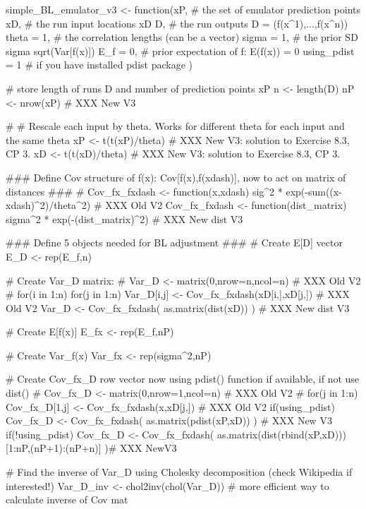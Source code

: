 simple_BL_emulator_v3 <- function(xP,             # the set of emulator prediction points
                                  xD,             # the run input locations xD
                                  D,              # the run outputs D = (f(x^1),...,f(x^n))
                                  theta = 1,      # the correlation lengths (can be a vector)
                                  sigma = 1,      # the prior SD sigma sqrt(Var[f(x)])
                                  E_f = 0,         # prior expectation of f: E(f(x)) = 0 
                                  using_pdist = 1  # if you have installed pdist package
){
  
  # store length of runs D and number of prediction points xP
  n <- length(D)
  nP <- nrow(xP)       # XXX New V3
  
  # # Rescale each input by theta. Works for different theta for each input and the same theta
  xP <- t(t(xP)/theta)     # XXX New V3: solution to Exercise 8.3, CP 3.
  xD <- t(t(xD)/theta)     # XXX New V3: solution to Exercise 8.3, CP 3.
  
  ### Define Cov structure of f(x): Cov[f(x),f(xdash)], now to act on matrix of distances ###
  # Cov_fx_fxdash <- function(x,xdash) sig^2 * exp(-sum((x-xdash)^2)/theta^2) # XXX Old V2
  Cov_fx_fxdash <- function(dist_matrix) sigma^2 * exp(-(dist_matrix)^2) # XXX New dist V3
  
  
  ### Define 5 objects needed for BL adjustment ###
  # Create E[D] vector
  E_D <- rep(E_f,n)
  
  # Create Var_D matrix:
  # Var_D <- matrix(0,nrow=n,ncol=n)                                        # XXX Old V2
  # for(i in 1:n) for(j in 1:n) Var_D[i,j] <- Cov_fx_fxdash(xD[i,],xD[j,])  # XXX Old V2
  Var_D <- Cov_fx_fxdash( as.matrix(dist(xD)) )                       # XXX New dist V3
  
  # Create E[f(x)]
  E_fx <- rep(E_f,nP)
  
  # Create Var_f(x) 
  Var_fx <- rep(sigma^2,nP)
  
  # Create Cov_fx_D row vector now using pdist() function if available, if not use dist()
  # Cov_fx_D <- matrix(0,nrow=1,ncol=n)                       # XXX Old V2
  # for(j in 1:n) Cov_fx_D[1,j] <- Cov_fx_fxdash(x,xD[j,])    # XXX Old V2
  if(using_pdist)  Cov_fx_D <- Cov_fx_fxdash( as.matrix(pdist(xP,xD)) )   # XXX New V3
  if(!using_pdist) 
    Cov_fx_D <- Cov_fx_fxdash( as.matrix(dist(rbind(xP,xD)))[1:nP,(nP+1):(nP+n)] )# XXX NewV3
  
  # Find the inverse of Var_D using Cholesky decomposition (check Wikipedia if interested!)
  Var_D_inv <- chol2inv(chol(Var_D))     # more efficient way to calculate inverse of Cov mat
  
}

